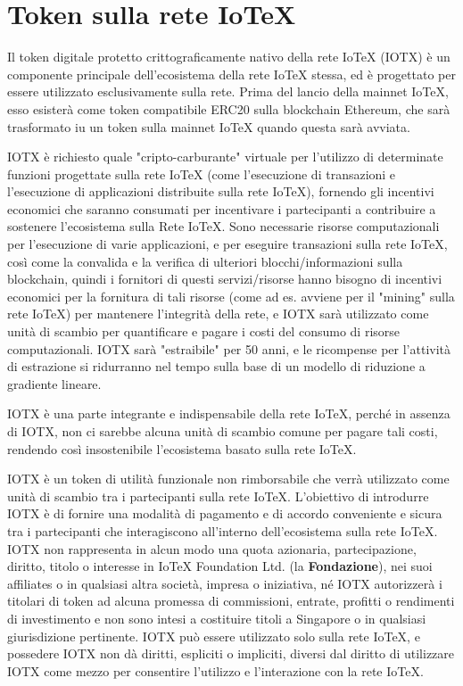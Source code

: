 \section{Token sulla rete IoTeX}
Il token digitale protetto crittograficamente nativo della rete IoTeX (IOTX) è un componente principale dell'ecosistema della rete IoTeX stessa, ed è progettato per essere utilizzato esclusivamente sulla rete. Prima del lancio della mainnet IoTeX, esso esisterà come token compatibile ERC20 sulla blockchain Ethereum, che sarà trasformato iu un token sulla mainnet IoTeX quando questa sarà avviata.

IOTX è richiesto quale "cripto-carburante" virtuale per l'utilizzo di determinate funzioni progettate sulla rete IoTeX (come l'esecuzione di transazioni e l'esecuzione di applicazioni distribuite sulla rete IoTeX), fornendo gli incentivi economici che saranno consumati per incentivare i partecipanti a contribuire a sostenere l'ecosistema sulla Rete IoTeX. Sono necessarie risorse computazionali per l'esecuzione di varie applicazioni, e per eseguire transazioni sulla rete IoTeX, così come la convalida e la verifica di ulteriori blocchi/informazioni sulla blockchain, quindi i fornitori di questi servizi/risorse hanno bisogno di incentivi economici per la fornitura di tali risorse (come ad es. avviene per il "mining" sulla rete IoTeX) per mantenere l'integrità della rete, e IOTX sarà utilizzato come unità di scambio per quantificare e pagare i costi del consumo di risorse computazionali. IOTX sarà "estraibile" per 50 anni, e le ricompense per l'attività di estrazione si ridurranno nel tempo sulla base di un modello di riduzione a gradiente lineare.

IOTX è una parte integrante e indispensabile della rete IoTeX, perché in assenza di IOTX, non ci sarebbe alcuna unità di scambio comune per pagare tali costi, rendendo così insostenibile l'ecosistema basato sulla rete IoTeX.

IOTX è un token di utilità funzionale non rimborsabile che verrà utilizzato come unità di scambio tra i partecipanti sulla rete IoTeX. L'obiettivo di introdurre IOTX è di fornire una modalità di pagamento e di accordo conveniente e sicura tra i partecipanti che interagiscono all'interno dell'ecosistema sulla rete IoTeX. IOTX non rappresenta in alcun modo una quota azionaria, partecipazione, diritto, titolo o interesse in IoTeX Foundation Ltd. (la \textbf{Fondazione}), nei suoi affiliates o in qualsiasi altra società, impresa o iniziativa, né IOTX autorizzerà i titolari di token ad alcuna promessa di commissioni, entrate, profitti o rendimenti di investimento e non sono intesi a costituire titoli a Singapore o in qualsiasi giurisdizione pertinente. IOTX può essere utilizzato solo sulla rete IoTeX, e possedere IOTX non dà diritti, espliciti o impliciti, diversi dal diritto di utilizzare IOTX come mezzo per consentire l'utilizzo e l'interazione con la rete IoTeX.

